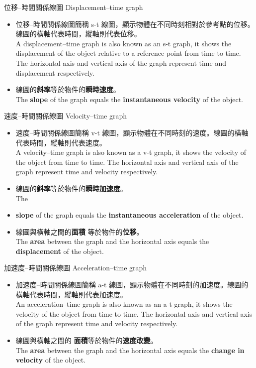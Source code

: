 \documentclass[beamer=true]{standalone}
\begin{document}
\begin{frame}{位移–時間關係線圖 Displacement–time graph}
    \begin{itemize}
        \item 位移–時間關係線圖簡稱 s-t 線圖，顯示物體在不同時刻相對於參考點的位移。線圖的橫軸代表時間，縱軸則代表位移。\\A displacement–time graph is also known as an s-t graph, it shows the displacement of the object relative to a reference point from time to time. The horizontal axis and vertical axis of the graph represent time and displacement respectively.
        \item 線圖的\textbf{斜率}等於物件的\textbf{瞬時速度}。 \\The \textbf{slope} of the graph equals the \textbf{instantaneous velocity} of the object.
    \end{itemize}
\end{frame}
\begin{frame}{速度–時間關係線圖 Velocity–time graph}
    \begin{itemize}
        \item 速度–時間關係線圖簡稱 v-t 線圖，顯示物體在不同時刻的速度。線圖的橫軸代表時間，縱軸則代表速度。\\ A velocity–time graph is also known as a v-t graph, it shows the velocity of the object from time to time. The horizontal axis and vertical axis of the graph represent time and velocity respectively.
        \item 線圖的\textbf{鈄率}等於物件的\textbf{瞬時加速度}。 \\The
        \item \textbf{slope} of the graph equals the \textbf{instantaneous acceleration} of the object.
        \item 線圖與橫軸之間的\textbf{面積} 等於物件的\textbf{位移}。\\ The \textbf{area} between the graph and the horizontal axis equals the \textbf{displacement} of the object.
    \end{itemize}
\end{frame}

\begin{frame}{加速度–時間關係線圖 Acceleration–time graph}
    \begin{itemize}
        \item 加速度–時間關係線圖簡稱 a-t 線圖，顯示物體在不同時刻的加速度。線圖的橫軸代表時間，縱軸則代表加速度。 \\An acceleration–time graph is also known as an a-t graph, it shows the velocity of the object from time to time. The horizontal axis and vertical axis of the graph represent time and velocity respectively.
        \item 線圖與橫軸之間的 \textbf{面積}等於物件的\textbf{速度改變}。 \\The \textbf{area} between the graph and the horizontal axis equals the \textbf{change in velocity} of the object.
    \end{itemize}
\end{frame}
\end{document}
